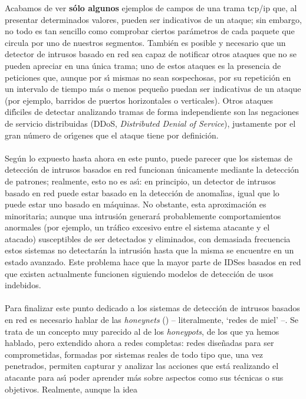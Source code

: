 Acabamos de ver {\bf s\'olo algunos} ejemplos de campos de una trama {\sc 
tcp/ip} que, 
al presentar determinados valores, pueden ser indicativos de un ataque; sin 
embargo, no todo es tan sencillo como comprobar ciertos par\'ametros de cada
paquete que circula por uno de nuestros segmentos. Tambi\'en es posible y 
necesario que un detector de intrusos basado en red sea capaz de notificar 
otros ataques que no se pueden apreciar en una \'unica trama; uno de estos
ataques es la presencia de peticiones que, aunque por s\'{\i} mismas no sean 
sospechosas, por su repetici\'on en un intervalo de tiempo m\'as o menos 
peque\~no puedan ser indicativas de un ataque (por ejemplo, barridos de puertos 
horizontales o verticales). Otros ataques dif\'{\i}ciles de detectar analizando
tramas de forma independiente son las negaciones de servicio distribuidas 
(DDoS, {\it Distributed Denial of Service}), justamente por el gran n\'umero de
or\'{\i}genes que el ataque tiene por definici\'on.\\
\\Seg\'un lo expuesto hasta ahora en este punto, puede parecer que los sistemas
de detecci\'on de intrusos basados en red funcionan \'unicamente mediante la
detecci\'on de patrones; realmente, esto no es as\'{\i}: en principio, un 
detector de intrusos basado en red puede estar basado en la detecci\'on de 
anomal\'{\i}as, igual que lo puede estar uno basado en m\'aquinas. No obstante,
esta aproximaci\'on es minoritaria; aunque una intrusi\'on generar\'a 
probablemente comportamientos anormales (por ejemplo, un tr\'afico excesivo 
entre el sistema atacante y el atacado) susceptibles de ser detectados y 
eliminados, con demasiada frecuencia estos sistemas no detectar\'an la 
intrusi\'on hasta que la misma se encuentre en un estado avanzado. Este problema
hace que la mayor parte de IDSes basados en red que existen actualmente 
funcionen siguiendo modelos de detecci\'on de usos indebidos.\\
\\Para finalizar este punto dedicado a los sistemas de detecci\'on de intrusos 
basados en red es necesario hablar de las {\it honeynets} (\cite{kn:spi01}) -- 
literalmente, `redes de miel' --. Se trata de un concepto muy parecido al de
los {\it honeypots}, de los que ya hemos hablado, pero extendido ahora a redes
completas: redes dise\~nadas para ser comprometidas, formadas por sistemas 
reales de todo tipo que, una vez penetrados, permiten capturar y analizar las
acciones que est\'a realizando el atacante para as\'{\i} poder aprender m\'as
sobre aspectos como sus t\'ecnicas o sus objetivos. Realmente, aunque la idea

